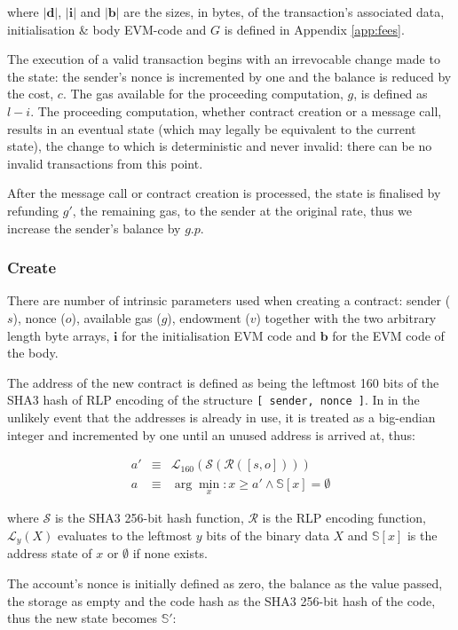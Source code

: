 \documentclass[9pt,oneside]{amsart}
\begin{document}
\begin{multicols}{2}
where $|\mathbf{d}|$, $|\mathbf{i}|$ and $|\mathbf{b}|$ are the sizes, in bytes, of the transaction's associated data, initialisation \& body EVM-code and $G$ is defined in Appendix \ref{app:fees}.

The execution of a valid transaction begins with an irrevocable change made to the state: the sender's nonce is incremented by one and the balance is reduced by the cost, $c$. The gas available for the proceeding computation, $g$, is defined as $l - i$. The proceeding computation, whether contract creation or a message call, results in an eventual state (which may legally be equivalent to the current state), the change to which is deterministic and never invalid: there can be no invalid transactions from this point.

After the message call or contract creation is processed, the state is finalised by refunding $g'$, the remaining gas, to the sender at the original rate, thus we increase the sender's balance by $g.p$.

\subsubsection{Create} \label{ch:create}

There are number of intrinsic parameters used when creating a contract: sender ($s$), nonce ($o$), available gas ($g$), endowment ($v$) together with the two arbitrary length byte arrays, $\mathbf{i}$ for the initialisation EVM code and $\mathbf{b}$ for the EVM code of the body.

The address of the new contract is defined as being the leftmost 160 bits of the SHA3 hash of RLP encoding of the structure \texttt{[ sender, nonce ]}. In in the unlikely event that the addresses is already in use, it is treated as a big-endian integer and incremented by one until an unused address is arrived at, thus:

\begin{eqnarray}
a' & \equiv & \mathcal{L}_{160}(\mathcal{S}(\mathcal{R}([s, o])))\\
a & \equiv & \arg \min_x : x \geq a' \wedge \mathbb{S}[x] = \emptyset
\end{eqnarray}

where $\mathcal{S}$ is the SHA3 256-bit hash function, $\mathcal{R}$ is the RLP encoding function, $\mathcal{L}_y(X)$ evaluates to the leftmost $y$ bits of the binary data $X$ and $\mathbb{S}[x]$ is the address state of $x$ or $\emptyset$ if none exists.

The account's nonce is initially defined as zero, the balance as the value passed, the storage as empty and the code hash as the SHA3 256-bit hash of the code, thus the new state becomes $\mathbb{S}'$:


\end{multicols}
\end{document}
